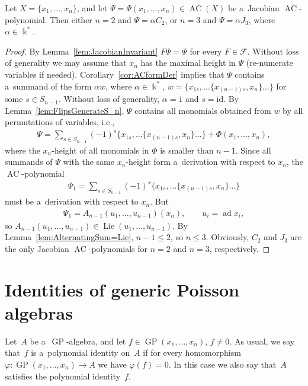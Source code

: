 \documentclass[pdftex]{sigma}
\DeclareMathOperator{\ad}{ad}
\begin{document}
\begin{theorem}
Let $X=\{x_1,\dots, x_n\}$, and let $\Psi =\Psi(x_1,\dots, x_n)\in \operatorname{AC}(X)$ be a~Jacobian $\operatorname{AC}$-polynomial.
Then either $n=2$ and $\Psi = \alpha C_2$, or $n=3$ and $\Psi = \alpha J_3$, where $\alpha \in \Bbbk^*$.
\end{theorem}

\begin{proof}
By Lemma~\ref{lem:JacobianInvariant} $F\Psi = \Psi$ for every $F\in \mathcal F$.
Without loss of generality we may assume that $x_n$ has the maximal height in $\Psi $ (re-numerate variables if needed).
Corollary~\ref{cor:ACformDer} implies that $\Psi $ contains a~summand of the form $\alpha w$, where $\alpha\in\Bbbk^*$,
$w = \{x_{1s}, \dots \{x_{(n-1)s}, x_n\}\dots \}$ for some $s\in S_{n-1}$.
Without loss of generality, $\alpha =1$ and $s=\mathrm{id}$.
By Lemma~\ref{lem:FlipsGenerateS_n}, $\Psi $ contains all monomials obtained from $w $ by all permutations of variables,
i.e.,
\begin{gather*}
\Psi = \sum\limits_{s\in S_{n-1}}(-1)^s \{x_{1s}, \dots \{x_{(n-1)s}, x_n\}\dots \} + \Phi(x_1,\dots, x_n),
\end{gather*}
where the $x_n$-height of all monomials in $\Phi $ is smaller than $n-1$.
Since all summands of $\Psi $ with the same $x_n$-height form a~derivation with respect to $x_n$, the $\operatorname{AC}$-polynomial
\begin{gather*}
\Psi_1 = \sum\limits_{s\in S_{n-1}}(-1)^s \{x_{1s}, \dots \{x_{(n-1)s}, x_n\}\dots \}
\end{gather*}
must be a~derivation with respect to $x_n$.
But
\begin{gather*}
\Psi_1 = A_{n-1}(u_1,\dots, u_{n-1})(x_n),
\qquad
u_i=\ad x_i,
\end{gather*}
so $A_{n-1}(u_1,\dots, u_{n-1})\in \operatorname{Lie}(u_1,\dots, u_{n-1})$.
By Lemma~\ref{lem:AlternatingSum=Lie}, $n-1\le 2$, so $n\le 3$.
Obviously, $C_2$ and $J_3$ are the only Jacobian $\operatorname{AC}$-polynomials for $n=2$ and $n=3$, respectively.
\end{proof}


\section{Identities of generic Poisson algebras}

Let~$A$ be a~$\operatorname{GP}$-algebra, and let $f\in \operatorname{GP}(x_1,\dots, x_n)$, $f\ne 0$.
As usual, we say that~$f$ is a~polynomial identity on~$A$ if for every homomorphism $\varphi: \operatorname{GP}(x_1,\dots, x_n) \to A$
we have \mbox{$\varphi(f)=0$}.
In this case we also say that~$A$ satisf\/ies the polynomial identity~$f$.
\end{document}
